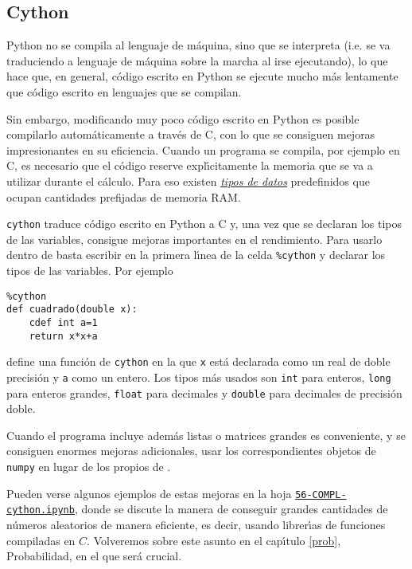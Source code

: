 


\subsection{Cython}\label{cython}

Python no se compila al lenguaje de m\'aquina, sino que se interpreta (i.e. se
va traduciendo a lenguaje de m\'aquina sobre la marcha al irse ejecutando),  lo
que hace que, en general, c\'odigo escrito en Python se ejecute mucho m\'as
lentamente que c\'odigo escrito en  lenguajes que se compilan. 

Sin embargo, modificando muy poco c\'odigo escrito en Python es posible
compilarlo autom\'aticamente a trav\'es de  C, con lo que se consiguen mejoras
impresionantes en su eficiencia. Cuando un programa se compila, por ejemplo en
C, es 
necesario que el c\'odigo reserve expl\'{\i}citamente   la memoria que se va
a utilizar durante el c\'alculo. 
Para eso existen \hyperref[tipos]{\itshape tipos de datos} predefinidos que
ocupan cantidades prefijadas de memoria RAM. 


\lstinline|cython| traduce c\'odigo escrito en Python a C y, una vez que se
declaran los
tipos de las variables, consigue mejoras importantes en el rendimiento. Para
usarlo dentro de {\sage} basta escribir en la primera l\'{\i}nea de  la celda 
\lstinline|%cython| y declarar los tipos de las variables. Por ejemplo

\begin{lstlisting}
%cython
def cuadrado(double x):
    cdef int a=1
    return x*x+a
\end{lstlisting}
\noindent define una  funci\'on de \lstinline|cython| en la que \lstinline$x$
est\'a declarada como un
real de doble precisi\'on y \lstinline$a$ como un entero. Los tipos m\'as usados
son
\lstinline|int| para enteros, \lstinline|long| para enteros grandes,
\lstinline|float| para decimales y \lstinline|double| para decimales de
precisi\'on doble. 



Cuando el programa incluye adem\'as listas o matrices grandes es conveniente, y
se consiguen enormes mejoras adicionales,  usar los correspondientes objetos de
\lstinline|numpy| en lugar de los propios de {\sage}. 


Pueden verse algunos ejemplos de estas mejoras en la hoja
\href{http://localhost:8888/notebooks/PROGR/COMPL/56-COMPL-cython.ipynb}{\tt 56-COMPL-cython.ipynb},  
 donde  se discute la manera de conseguir
grandes cantidades de n\'umeros aleatorios de manera eficiente, es decir, usando
librer\'{\i}as de funciones compiladas en $C$. Volveremos sobre este asunto en
el cap\'{\i}tulo \ref{prob}, Probabilidad,  en el que ser\'a crucial.


